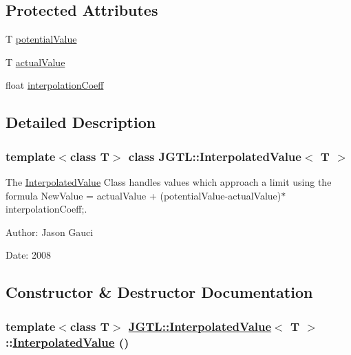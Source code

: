 \subsection*{Protected Attributes}
\begin{CompactItemize}
\item 
T \hyperlink{class_j_g_t_l_1_1_interpolated_value_38e69e9add9640f5678a877ffd99ac4e}{potential\-Value}
\item 
T \hyperlink{class_j_g_t_l_1_1_interpolated_value_db402fa9ddb87fc80411e1bbbd88241f}{actual\-Value}
\item 
float \hyperlink{class_j_g_t_l_1_1_interpolated_value_5f7a5762a8a5cb68597b8fc1a406d9d0}{interpolation\-Coeff}
\end{CompactItemize}


\subsection{Detailed Description}
\subsubsection*{template$<$class T$>$ class JGTL::Interpolated\-Value$<$ T $>$}

The \hyperlink{class_j_g_t_l_1_1_interpolated_value}{Interpolated\-Value} Class handles values which approach a limit using the formula New\-Value = actual\-Value + (potential\-Value-actual\-Value)$\ast$interpolation\-Coeff;. 

\begin{Desc}
\item[Author:]Jason Gauci \end{Desc}
\begin{Desc}
\item[Date:]2008 \end{Desc}




\subsection{Constructor \& Destructor Documentation}
\hypertarget{class_j_g_t_l_1_1_interpolated_value_bccb0ff62b1196afd31d0fec4794f3e7}{
\subsubsection[InterpolatedValue]{\setlength{\rightskip}{0pt plus 5cm}template$<$class T$>$ \hyperlink{class_j_g_t_l_1_1_interpolated_value}{JGTL::Interpolated\-Value}$<$ T $>$::\hyperlink{class_j_g_t_l_1_1_interpolated_value}{Interpolated\-Value} ()}}
\label{class_j_g_t_l_1_1_interpolated_value_bccb0ff62b1196afd31d0fec4794f3e7}


